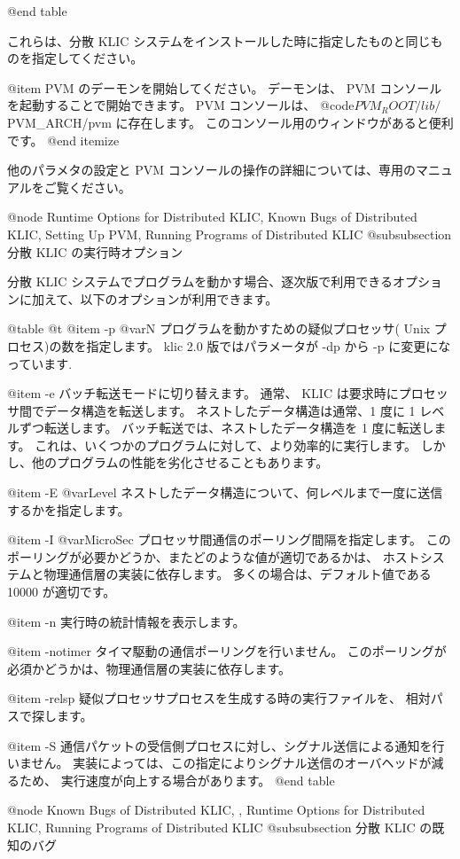 {{{{@end table

これらは、分散 KLIC システムをインストールした時に指定したものと同じものを指定してください。

@item
 PVM のデーモンを開始してください。
デーモンは、 PVM コンソールを起動することで開始できます。
 PVM コンソールは、 @code{$PVM_ROOT/lib/$PVM_ARCH/pvm} に存在します。
このコンソール用のウィンドウがあると便利です。
@end itemize

他のパラメタの設定と PVM コンソールの操作の詳細については、専用のマニュアルをご覧ください。

@node Runtime Options for Distributed KLIC, Known Bugs of Distributed KLIC, Setting Up PVM, Running Programs of Distributed KLIC
@subsubsection 分散 KLIC の実行時オプション

分散 KLIC システムでプログラムを動かす場合、逐次版で利用できるオプションに加えて、以下のオプションが利用できます。

@table @t
@item -p @var{N}
プログラムを動かすための疑似プロセッサ( Unix プロセス)の数を指定します。
 klic 2.0 版ではパラメータが -dp から -p に変更になっています.

@item -e
バッチ転送モードに切り替えます。
通常、 KLIC は要求時にプロセッサ間でデータ構造を転送します。
ネストしたデータ構造は通常、1 度に 1 レベルずつ転送します。
バッチ転送では、ネストしたデータ構造を 1 度に転送します。
これは、いくつかのプログラムに対して、より効率的に実行します。
しかし、他のプログラムの性能を劣化させることもあります。

@item -E @var{Level}
ネストしたデータ構造について、何レベルまで一度に送信するかを指定します。

@item -I @var{MicroSec}
プロセッサ間通信のポーリング間隔を指定します。
このポーリングが必要かどうか、またどのような値が適切であるかは、
ホストシステムと物理通信層の実装に依存します。
多くの場合は、デフォルト値である 10000 が適切です。

@item -n
実行時の統計情報を表示します。

@item -notimer
タイマ駆動の通信ポーリングを行いません。
このポーリングが必須かどうかは、物理通信層の実装に依存します。

@item -relsp
疑似プロセッサプロセスを生成する時の実行ファイルを、
相対パスで探します。

@item -S
通信パケットの受信側プロセスに対し、シグナル送信による通知を行いません。
実装によっては、この指定によりシグナル送信のオーバヘッドが減るため、
実行速度が向上する場合があります。
@end table

@node Known Bugs of Distributed KLIC,  , Runtime Options for Distributed KLIC, Running Programs of Distributed KLIC
@subsubsection 分散 KLIC の既知のバグ

}}}}
